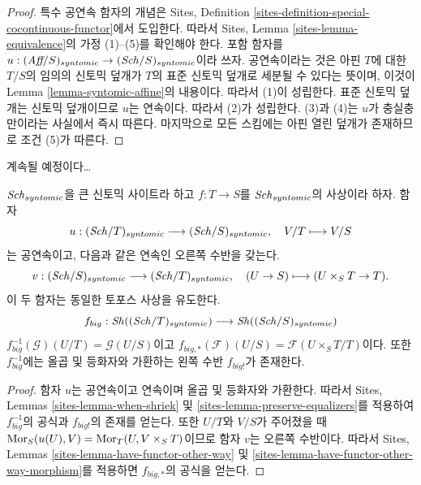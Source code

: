 \begin{proof}
특수 공연속 함자의 개념은 Sites, Definition
\ref{sites-definition-special-cocontinuous-functor}에서 도입한다. 따라서
Sites, Lemma \ref{sites-lemma-equivalence}의 가정 (1)--(5)를 확인해야
한다. 포함 함자를
$u : (\textit{Aff}/S)_{syntomic} \to (\mathit{Sch}/S)_{syntomic}$이라 쓰자.
공연속이라는 것은 아핀 $T$에 대한 $T/S$의 임의의 신토믹 덮개가
$T$의 표준 신토믹 덮개로 세분될 수 있다는 뜻이며, 이것이 Lemma
\ref{lemma-syntomic-affine}의 내용이다. 따라서 (1)이 성립한다. 표준
신토믹 덮개는 신토믹 덮개이므로 $u$는 연속이다. 따라서 (2)가
성립한다. (3)과 (4)는 $u$가 충실충만이라는 사실에서 즉시 따른다.
마지막으로 모든 스킴에는 아핀 열린 덮개가 존재하므로 조건 (5)가
따른다.
\end{proof}

\noindent
계속될 예정이다\ldots

\begin{lemma}
\label{lemma-morphism-big-syntomic}
$\mathit{Sch}_{syntomic}$을 큰 신토믹 사이트라 하고
$f : T \to S$를 $\mathit{Sch}_{syntomic}$의 사상이라 하자. 함자
$$
u : (\mathit{Sch}/T)_{syntomic} \longrightarrow (\mathit{Sch}/S)_{syntomic},
\quad
V/T \longmapsto V/S
$$
는 공연속이고, 다음과 같은 연속인 오른쪽 수반을 갖는다.
$$
v : (\mathit{Sch}/S)_{syntomic} \longrightarrow (\mathit{Sch}/T)_{syntomic},
\quad
(U \to S) \longmapsto (U \times_S T \to T).
$$
이 두 함자는 동일한 토포스 사상을 유도한다.
$$
f_{big} :
\mathop{\mathit{Sh}}\nolimits((\mathit{Sch}/T)_{syntomic})
\longrightarrow
\mathop{\mathit{Sh}}\nolimits((\mathit{Sch}/S)_{syntomic})
$$
$f_{big}^{-1}(\mathcal{G})(U/T) = \mathcal{G}(U/S)$이고
$f_{big, *}(\mathcal{F})(U/S) = \mathcal{F}(U \times_S T/T)$이다.
또한 $f_{big}^{-1}$에는 올곱 및 등화자와 가환하는 왼쪽 수반
$f_{big!}$가 존재한다.
\end{lemma}

\begin{proof}
함자 $u$는 공연속이고 연속이며 올곱 및 등화자와 가환한다. 따라서
Sites, Lemmas \ref{sites-lemma-when-shriek} 및
\ref{sites-lemma-preserve-equalizers}를 적용하여 $f_{big}^{-1}$의 공식과
$f_{big!}$의 존재를 얻는다. 또한 $U/T$와 $V/S$가 주어졌을 때
$\mathop{\mathrm{Mor}}\nolimits_S(u(U), V) = \mathop{\mathrm{Mor}}\nolimits_T(U, V \times_S T)$이므로 함자 $v$는 오른쪽
수반이다. 따라서 Sites, Lemmas
\ref{sites-lemma-have-functor-other-way} 및
\ref{sites-lemma-have-functor-other-way-morphism}를 적용하면
$f_{big, *}$의 공식을 얻는다.
\end{proof}













